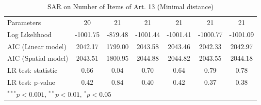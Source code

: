 \begin{table}[!h]
\begin{center}
\begin{tabular}{l c c c c c c }
Parameters              & 20           & 21           & 21           & 21           & 21           & 21           \\
Log Likelihood          & -1001.75     & -879.48      & -1001.44     & -1001.41     & -1000.77     & -1001.09     \\
AIC (Linear model)      & 2042.17      & 1799.00      & 2043.58      & 2043.46      & 2042.33      & 2042.97      \\
AIC (Spatial model)     & 2043.51      & 1800.95      & 2044.88      & 2044.82      & 2043.55      & 2044.18      \\
LR test: statistic      & 0.66         & 0.04         & 0.70         & 0.64         & 0.79         & 0.78         \\
LR test: p-value        & 0.42         & 0.84         & 0.40         & 0.42         & 0.37         & 0.38         \\
\bottomrule
\multicolumn{7}{l}{\scriptsize{$^{***}p<0.001$, $^{**}p<0.01$, $^*p<0.05$}}
\end{tabular}
\caption{SAR on Number of Items of Art. 13 (Minimal distance)}
\label{table:coefficients}
\end{center}
\end{table}
